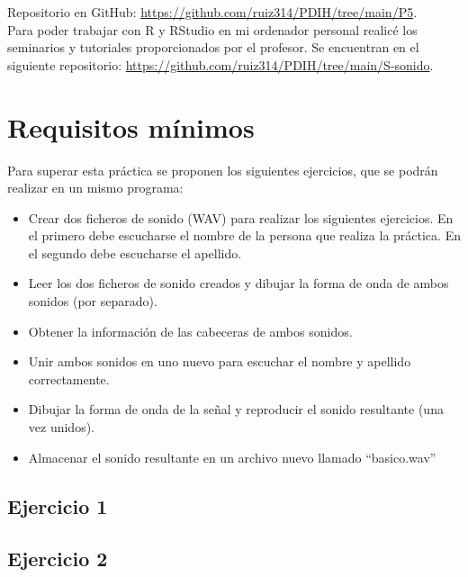 \documentclass[a4paper]{article}
\begin{document}
Repositorio en GitHub: \url{https://github.com/ruiz314/PDIH/tree/main/P5}.\\

Para poder trabajar con R y RStudio en mi ordenador personal realicé los seminarios y tutoriales proporcionados por el profesor. Se encuentran en el siguiente repositorio: \url{https://github.com/ruiz314/PDIH/tree/main/S-sonido}.

\section{Requisitos mínimos}
 Para superar esta práctica se proponen los siguientes ejercicios, que se podrán realizar en un mismo programa:

\begin{itemize}
    \item Crear dos ficheros de sonido (WAV) para realizar los siguientes ejercicios. En el primero debe escucharse el nombre de la persona que realiza la práctica. En el segundo debe escucharse el apellido.
    \item Leer los dos ficheros de sonido creados y dibujar la forma de onda de ambos sonidos (por separado).

    \item Obtener la información de las cabeceras de ambos sonidos.

    \item Unir ambos sonidos en uno nuevo para escuchar el nombre y apellido correctamente.

    \item Dibujar la forma de onda de la señal y reproducir el sonido resultante (una vez unidos).

    \item Almacenar el sonido resultante en un archivo nuevo llamado ``basico.wav''  
\end{itemize}

\subsection{Ejercicio 1}\label{subsec:ej1}



\subsection{Ejercicio 2}\label{subsec:ej2}

\end{document}
